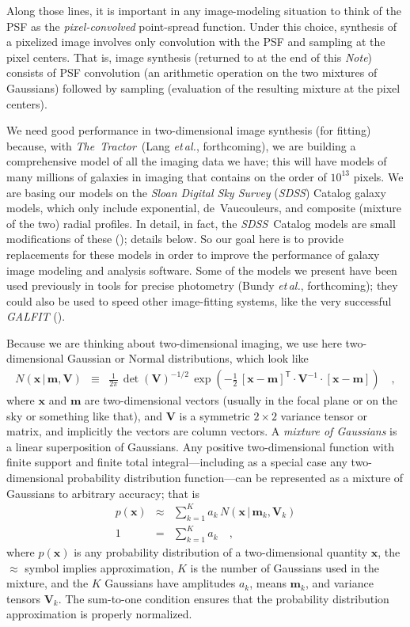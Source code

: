 \documentclass[12pt,pdftex,preprint]{aastex}
\newcommand{\foreign}[1]{\textit{#1}}
\newcommand{\etal}{\foreign{et\,al.}}
\newcommand{\documentname}{\textsl{Note}}
\newcommand{\project}[1]{\textsl{#1}}
\newcommand{\thetractor}{\project{The~Tractor}}
\newcommand{\sdss}{\project{SDSS}}
\newcommand{\tmatrix}[1]{\boldsymbol{#1}}
\newcommand{\inverse}[1]{{#1}^{-1}}
\newcommand{\transpose}[1]{{#1}^{\mathsf T}}
\newcommand{\tvector}[1]{\boldsymbol{#1}}
\newcommand{\pos}{\tvector{x}}
\newcommand{\mean}{\tvector{m}}
\newcommand{\var}{\tmatrix{V}}
\newcommand{\normal}{N}
\newcommand{\given}{\,|\,}
\begin{document}
Along those lines, it is important in any image-modeling situation to
think of the PSF as the \emph{pixel-convolved} point-spread function.
Under this choice, synthesis of a pixelized image involves only
convolution with the PSF and sampling at the pixel centers.  That is,
image synthesis (returned to at the end of this \documentname)
consists of PSF convolution (an arithmetic operation on the two
mixtures of Gaussians) followed by sampling (evaluation of the
resulting mixture at the pixel centers).

We need good performance in two-dimensional image synthesis (for
fitting) because, with \thetractor\ (Lang \etal, forthcoming), we are
building a comprehensive model of all the imaging data we have; this
will have models of many millions of galaxies in imaging that contains
on the order of $10^{13}$ pixels.  We are basing our models on the
\project{Sloan Digital Sky Survey} (\sdss) Catalog galaxy models,
which only include exponential, de~Vaucouleurs, and composite (mixture
of the two) radial profiles.  In detail, in fact, the \sdss\ Catalog
models are small modifications of these (\citealt{lupton}); details
below.  So our goal here is to provide replacements for these models
in order to improve the performance of galaxy image modeling and
analysis software.  Some of the models we present have been used
previously in tools for precise photometry (Bundy \etal, forthcoming);
they could also be used to speed other image-fitting systems, like the
very successful \project{GALFIT} (\citealt{galfit}).

Because we are thinking about two-dimensional imaging, we use here
two-dimensional Gaussian or Normal distributions, which look like
\begin{eqnarray}\displaystyle
\normal(\pos\given\mean,\var) &\equiv& \frac{1}{2\pi}\,\det(\var)^{-1/2}\,\exp(-\frac{1}{2}\,\transpose{[\pos-\mean]}\cdot\inverse{\var}\cdot[\pos-\mean])
\quad ,
\end{eqnarray}
where $\pos$ and $\mean$ are two-dimensional vectors (usually in the
focal plane or on the sky or something like that), and $\var$ is a
symmetric $2\times 2$ variance tensor or matrix, and implicitly the
vectors are column vectors.  A \emph{mixture of Gaussians} is a linear
superposition of Gaussians.  Any positive two-dimensional function
with finite support and finite total integral---including as a special
case any two-dimensional probability distribution function---can be
represented as a mixture of Gaussians to arbitrary accuracy; that is
\begin{eqnarray}
p(\pos) &\approx& \sum_{k=1}^K a_k\,\normal(\pos\given\mean_k,\var_k)
\\
1 &=& \sum_{k=1}^K a_k
\quad ,
\end{eqnarray}
where $p(\pos)$ is any probability distribution of a two-dimensional
quantity $\pos$, the $\approx$ symbol implies approximation, $K$ is
the number of Gaussians used in the mixture, and the $K$ Gaussians
have amplitudes $a_k$, means $\mean_k$, and variance tensors $\var_k$.
The sum-to-one condition ensures that the probability distribution
approximation is properly normalized.
\end{document}
